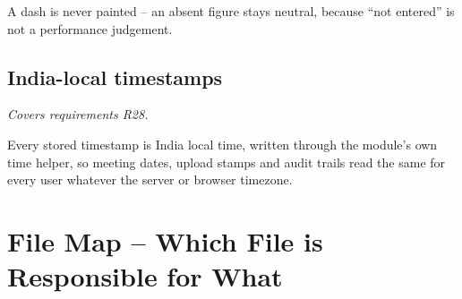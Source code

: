\documentclass[11pt,a4paper]{article}
\newcommand{\covers}[1]{\textit{Covers requirements #1.}\par}
\newcommand{\qt}[1]{\textquotedblleft #1\textquotedblright}
\begin{document}
A dash is never painted -- an absent figure stays neutral, because \qt{not entered} is not
a performance judgement.

\subsection{India-local timestamps}
\covers{R28}
Every stored timestamp is India local time, written through the module's own time helper,
so meeting dates, upload stamps and audit trails read the same for every user whatever the
server or browser timezone.

\section{File Map -- Which File is Responsible for What}
\end{document}
